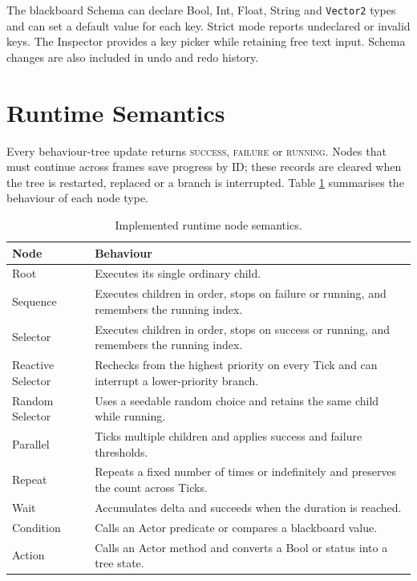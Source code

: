 The blackboard Schema can declare Bool, Int, Float, String and \texttt{Vector2} types and can set a default value for each key. Strict mode reports undeclared or invalid keys. The Inspector provides a key picker while retaining free text input. Schema changes are also included in undo and redo history.

\section{Runtime Semantics}

Every behaviour-tree update returns \textsc{success}, \textsc{failure} or \textsc{running}. Nodes that must continue across frames save progress by ID; these records are cleared when the tree is restarted, replaced or a branch is interrupted. Table \ref{tab:nodes} summarises the behaviour of each node type.

\begin{table}[htbp]
\centering
\caption{Implemented runtime node semantics.}\label{tab:nodes}
\begin{tabular}{p{}p{}}
\toprule Node & Behaviour \\
\midrule
Root & Executes its single ordinary child.\\
Sequence & Executes children in order, stops on failure or running, and remembers the running index.\\
Selector & Executes children in order, stops on success or running, and remembers the running index.\\
Reactive Selector & Rechecks from the highest priority on every Tick and can interrupt a lower-priority branch.\\
Random Selector & Uses a seedable random choice and retains the same child while running.\\
Parallel & Ticks multiple children and applies success and failure thresholds.\\
Repeat & Repeats a fixed number of times or indefinitely and preserves the count across Ticks.\\
Wait & Accumulates delta and succeeds when the duration is reached.\\
Condition & Calls an Actor predicate or compares a blackboard value.\\
Action & Calls an Actor method and converts a Bool or status into a tree state.\\
\bottomrule
\end{tabular}
\end{table}

